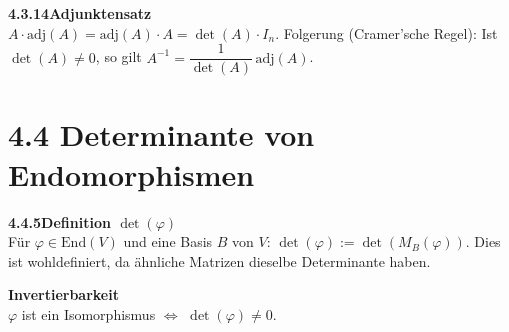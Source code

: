 \documentclass[a4paper,12pt]{article}
\newcommand{\gentry}[3]{%
  \noindent\textbf{#1\quad #2}\nopagebreak\\[0.2em]
  #3\par\smallskip
}
\begin{document}
\gentry{4.3.14}{Adjunktensatz}{%
  $A \cdot \mathrm{adj}(A) = \mathrm{adj}(A) \cdot A = \det(A) \cdot I_n$.
  Folgerung (Cramer'sche Regel): Ist $\det(A) \neq 0$, so gilt $A^{-1} = \dfrac{1}{\det(A)}\,\mathrm{adj}(A)$.
}

\section*{4.4 \quad Determinante von Endomorphismen}

\gentry{4.4.5}{Definition $\det(\varphi)$}{%
  Für $\varphi \in \mathrm{End}(V)$ und eine Basis $B$ von $V$: $\det(\varphi) := \det(M_B(\varphi))$.
  Dies ist wohldefiniert, da ähnliche Matrizen dieselbe Determinante haben.
}

\gentry{}{Invertierbarkeit}{%
  $\varphi$ ist ein Isomorphismus $\iff$ $\det(\varphi) \neq 0$.
}
\end{document}
